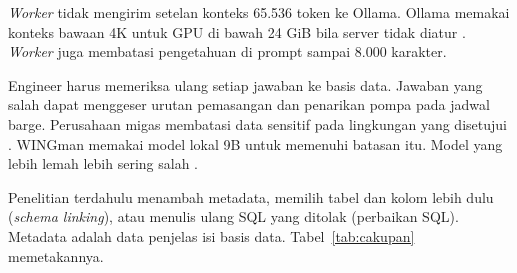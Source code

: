 \emph{Worker} tidak mengirim setelan konteks 65.536 token ke Ollama. Ollama memakai konteks bawaan 4K untuk GPU di bawah 24 GiB bila server tidak diatur \autocite{ollamacontextlength}. \emph{Worker} juga membatasi pengetahuan di prompt sampai 8.000 karakter.

Engineer harus memeriksa ulang setiap jawaban ke basis data. Jawaban yang salah dapat menggeser urutan pemasangan dan penarikan pompa pada jadwal barge. Perusahaan migas membatasi data sensitif pada lingkungan yang disetujui \autocite{taiwo2026evaluating}. WINGman memakai model lokal 9B untuk memenuhi batasan itu. Model yang lebih lemah lebih sering salah \autocite{shen2026understanding}.

Penelitian terdahulu menambah metadata, memilih tabel dan kolom lebih dulu (\emph{schema linking}), atau menulis ulang SQL yang ditolak (perbaikan SQL). Metadata adalah data penjelas isi basis data. Tabel~\ref{tab:cakupan} memetakannya.

